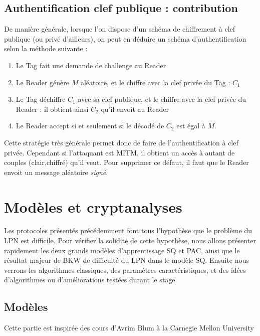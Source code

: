 \documentclass{article}		%
\theoremstyle{definition}
\theoremstyle{plain}
\theoremstyle{plain}
\theoremstyle{plain}
\theoremstyle{plain}
\theoremstyle{plain}
\begin{document}
\subsection{Authentification clef publique : contribution}
De manière générale, lorsque l'on dispose d'un schéma de chiffrement à
clef publique (ou privé d'ailleurs), on peut en déduire un schéma
d'authentification selon la méthode suivante :
\begin{enumerate}
\item Le Tag fait une demande de challenge au Reader
\item Le Reader génère $M$ aléatoire, et le chiffre avec la clef privée du
Tag : $C_1$
\item Le Tag déchiffre $C_1$ avec sa clef publique, et le chiffre avec la
clef privée du Reader : il obtient ainsi $C_2$ qu'il envoit au Reader
\item Le Reader accept si et seulement si le décodé de $C_2$ est égal à
$M$.
\end{enumerate}

Cette stratégie très générale permet donc de faire de l'authentification
à clef privée. Cependant si l'attaquant est MITM, il obtient un accès à
autant de couples (clair,chiffré) qu'il veut. Pour supprimer ce défaut,
il faut que le Reader envoit un message aléatoire \emph{signé}.




\section{Modèles et cryptanalyses}
Les protocoles présentés précédemment font tous l'hypothèse que le
problème du LPN est difficile. Pour vérifier la solidité de cette
hypothèse,   nous allons
présenter rapidement les deux grands modèles d'apprentissage SQ et PAC, ainsi que le
résultat majeur de BKW de difficulté du LPN dans le modèle SQ. Ensuite
nous verrons les algorithmes classiques, des paramètres caractéristiques,
et des idées d'algorithmes ou d'améliorations testées durant le stage.

\subsection{Modèles}
Cette partie est inspirée des cours d'Avrim
Blum à la Carnegie Mellon University
\end{document}
